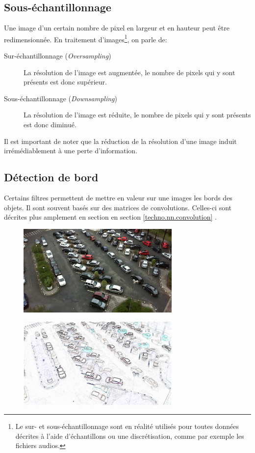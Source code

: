 \subsection{Sous-échantillonnage}
Une image d'un certain nombre de pixel en largeur et en hauteur peut être redimensionnée. En traitement d'images\footnote{Le sur- et sous-échantillonnage sont en réalité utilisés pour toutes données décrites à l'aide d'échantillons ou une discrétisation, comme par exemple les fichiers audios.}, on parle de:
\begin{description}
    \item[Sur-échantillonnage (\textit{Oversampling})] La résolution de l'image est augmentée, le nombre de pixels qui y sont présents est donc supérieur. 
    \item[Sous-échantillonnage (\textit{Downsampling})] La résolution de l'image est réduite, le nombre de pixels qui y sont présents est donc diminué. 
\end{description}

Il est important de noter que la réduction de la résolution d'une image induit irrémédiablement à une perte d'information. 


\subsection{Détection de bord}\label{techno.traitement.bord}
Certains filtres permettent de mettre en valeur sur une images les bords des objets. Il sont souvent basés sur des matrices de convolutions. Celles-ci sont décrites plus amplement en section en section \ref{techno.nn.convolution} . 

\begin{figure}[ht]
    \includegraphics[width=80mm]{img/conception/pklot_park.jpg}
    \centering
\end{figure}

\begin{figure}[ht]
    \includegraphics[width=80mm]{img/conception/image_process/downsample-edge/4.png}
    \centering
\end{figure}

